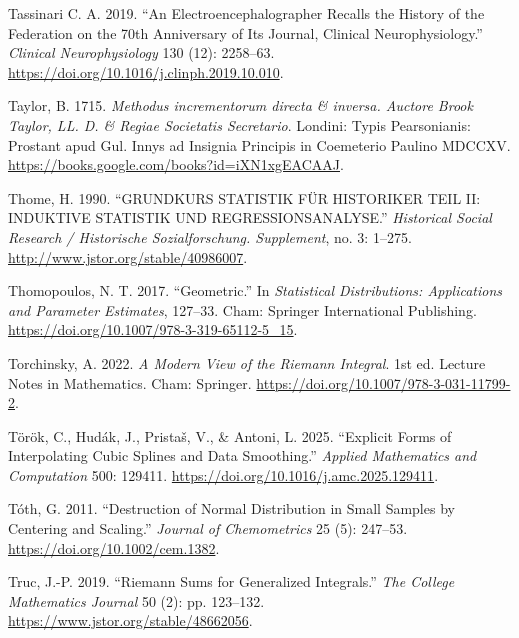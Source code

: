 \documentclass[
]{article}
\newlength{\cslhangindent}
\newlength{\cslentryspacingunit} %
\newenvironment{CSLReferences}[2] %
 {%
  \setlength{\parindent}{0pt}
  \ifodd #1
  \let\oldpar\par
  \def\par{\hangindent=\cslhangindent\oldpar}
  \fi
  \setlength{\parskip}{#2\cslentryspacingunit}
 }%
 {}
\begin{document}
\begin{CSLReferences}{1}{0}
\leavevmode{}%
Tassinari C. A. 2019. {``An Electroencephalographer Recalls the History
of the Federation on the 70th Anniversary of Its Journal, Clinical
Neurophysiology.''} \emph{Clinical Neurophysiology} 130 (12): 2258--63.
\url{https://doi.org/10.1016/j.clinph.2019.10.010}.

\leavevmode{}%
Taylor, B. 1715. \emph{{Methodus incrementorum directa \& inversa.
Auctore Brook Taylor, LL. D. \& Regiae Societatis Secretario}}. Londini:
Typis Pearsonianis: Prostant apud Gul. Innys ad Insignia Principis in
Coemeterio Paulino MDCCXV.
\url{https://books.google.com/books?id=iXN1xgEACAAJ}.

\leavevmode{}%
Thome, H. 1990. {``GRUNDKURS STATISTIK FÜR HISTORIKER TEIL II: INDUKTIVE
STATISTIK UND REGRESSIONSANALYSE.''} \emph{Historical Social Research /
Historische Sozialforschung. Supplement}, no. 3: 1--275.
\url{http://www.jstor.org/stable/40986007}.

\leavevmode{}%
Thomopoulos, N. T. 2017. {``Geometric.''} In \emph{Statistical
Distributions: Applications and Parameter Estimates}, 127--33. Cham:
Springer International Publishing.
\url{https://doi.org/10.1007/978-3-319-65112-5_15}.

\leavevmode{}%
Torchinsky, A. 2022. \emph{A Modern View of the Riemann Integral}. 1st
ed. Lecture Notes in Mathematics. Cham: Springer.
\url{https://doi.org/10.1007/978-3-031-11799-2}.

\leavevmode{}%
Török, C., Hudák, J., Pristaš, V., \& Antoni, L. 2025. {``Explicit Forms
of Interpolating Cubic Splines and Data Smoothing.''} \emph{Applied
Mathematics and Computation} 500: 129411.
\url{https://doi.org/10.1016/j.amc.2025.129411}.

\leavevmode{}%
Tóth, G. 2011. {``Destruction of Normal Distribution in Small Samples by
Centering and Scaling.''} \emph{Journal of Chemometrics} 25 (5):
247--53. \url{https://doi.org/10.1002/cem.1382}.

\leavevmode{}%
Truc, J.-P. 2019. {``Riemann Sums for Generalized Integrals.''}
\emph{The College Mathematics Journal} 50 (2): pp. 123--132.
\url{https://www.jstor.org/stable/48662056}.


\end{CSLReferences}
\end{document}
